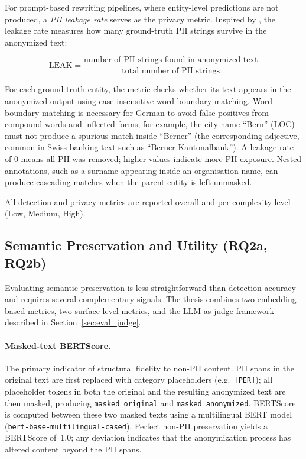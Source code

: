 For prompt-based rewriting pipelines, where entity-level predictions
are not produced, a \emph{PII leakage rate} serves as the privacy
metric. Inspired by \citet{siyan2025papillon}, the leakage rate
measures how many ground-truth PII strings survive in the anonymized
text:

\begin{equation}
\text{LEAK} = \frac{\text{number of PII strings found in anonymized text}}{\text{total number of PII strings}}
\label{eq:leakage}
\end{equation}

\noindent For each ground-truth entity, the metric checks whether its
text appears in the anonymized output using case-insensitive word
boundary matching. Word boundary matching is necessary for German to
avoid false positives from compound words and inflected forms; for
example, the city name ``Bern'' (LOC) must not produce a spurious
match inside ``Berner'' (the corresponding adjective, common in Swiss
banking text such as ``Berner Kantonalbank''). A leakage rate of 0 means all PII was removed; higher values indicate
more PII exposure. Nested annotations, such as a surname appearing
inside an organisation name, can produce cascading matches when the
parent entity is left unmasked.

All detection and privacy metrics are reported overall and per complexity level
(Low, Medium, High).


\subsection{Semantic Preservation and Utility (RQ2a, RQ2b)}
\label{sec:eval_semantic}

Evaluating semantic preservation is less straightforward than detection
accuracy and requires several complementary signals. The thesis combines
two embedding-based metrics, two surface-level metrics, and the
LLM-as-judge framework described in
Section~\ref{sec:eval_judge}.

\paragraph{Masked-text BERTScore.} The primary indicator of structural
fidelity to non-PII content. PII spans in the original text are first
replaced with category placeholders (e.g.\ \texttt{[PER]}); all
placeholder tokens in both the original and the resulting anonymized
text are then masked, producing \texttt{masked\_original} and
\texttt{masked\_anonymized}. BERTScore \citep{zhang2020bertscore} is
computed between these two masked texts using a multilingual BERT model
(\texttt{bert-base-multilingual-cased}). Perfect non-PII preservation
yields a BERTScore of~1.0; any deviation indicates that the
anonymization process has altered content beyond the PII spans.

